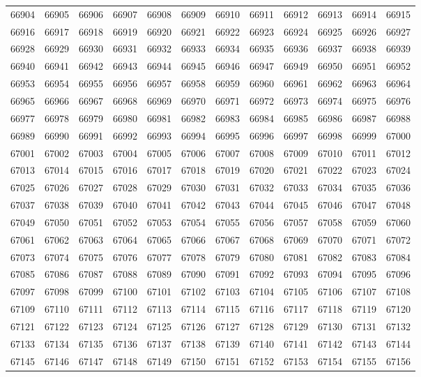 \begin{center}
\begin{longtable}{llllllllllll}
66904 &66905 &66906 &66907 &66908 &66909 &66910 &66911 &66912 &66913 &66914 &66915 \\
66916 &66917 &66918 &66919 &66920 &66921 &66922 &66923 &66924 &66925 &66926 &66927 \\
66928 &66929 &66930 &66931 &66932 &66933 &66934 &66935 &66936 &66937 &66938 &66939 \\
66940 &66941 &66942 &66943 &66944 &66945 &66946 &66947 &66949 &66950 &66951 &66952 \\
66953 &66954 &66955 &66956 &66957 &66958 &66959 &66960 &66961 &66962 &66963 &66964 \\
66965 &66966 &66967 &66968 &66969 &66970 &66971 &66972 &66973 &66974 &66975 &66976 \\
66977 &66978 &66979 &66980 &66981 &66982 &66983 &66984 &66985 &66986 &66987 &66988 \\
66989 &66990 &66991 &66992 &66993 &66994 &66995 &66996 &66997 &66998 &66999 &67000 \\
67001 &67002 &67003 &67004 &67005 &67006 &67007 &67008 &67009 &67010 &67011 &67012 \\
67013 &67014 &67015 &67016 &67017 &67018 &67019 &67020 &67021 &67022 &67023 &67024 \\
67025 &67026 &67027 &67028 &67029 &67030 &67031 &67032 &67033 &67034 &67035 &67036 \\
67037 &67038 &67039 &67040 &67041 &67042 &67043 &67044 &67045 &67046 &67047 &67048 \\
67049 &67050 &67051 &67052 &67053 &67054 &67055 &67056 &67057 &67058 &67059 &67060 \\
67061 &67062 &67063 &67064 &67065 &67066 &67067 &67068 &67069 &67070 &67071 &67072 \\
67073 &67074 &67075 &67076 &67077 &67078 &67079 &67080 &67081 &67082 &67083 &67084 \\
67085 &67086 &67087 &67088 &67089 &67090 &67091 &67092 &67093 &67094 &67095 &67096 \\
67097 &67098 &67099 &67100 &67101 &67102 &67103 &67104 &67105 &67106 &67107 &67108 \\
67109 &67110 &67111 &67112 &67113 &67114 &67115 &67116 &67117 &67118 &67119 &67120 \\
67121 &67122 &67123 &67124 &67125 &67126 &67127 &67128 &67129 &67130 &67131 &67132 \\
67133 &67134 &67135 &67136 &67137 &67138 &67139 &67140 &67141 &67142 &67143 &67144 \\
67145 &67146 &67147 &67148 &67149 &67150 &67151 &67152 &67153 &67154 &67155 &67156 \\

\end{longtable}
\end{center}
